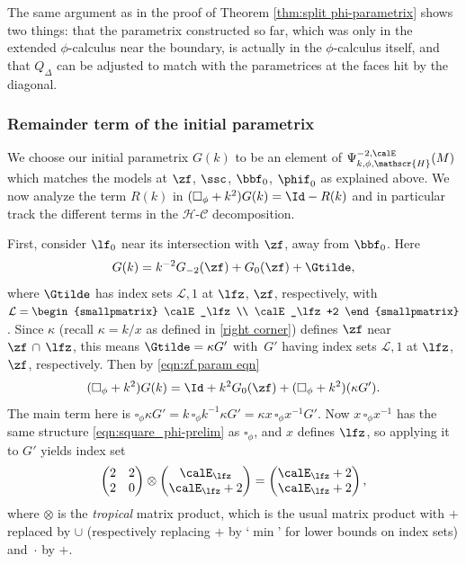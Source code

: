 The same argument as in the proof of Theorem \ref{thm:split phi-parametrix} shows two things: that the parametrix constructed so far, which was only in the extended $\phi$-calculus near the boundary, is actually in the $\phi$-calculus itself, and that $Q_\Delta$ can be adjusted to match with the parametrices at the faces hit by the diagonal.

\subsubsection{Remainder term of the initial parametrix}
We choose our initial parametrix $G(k)$ to be an element of $\Psi^{-2,\calE}_{k,\phi,\mathscr{H}}(M)$ which matches the models at $\zf$, $\ssc$, $\bbf_0$, $\phif_0$ as explained above. We now analyze the term $R(k)$ in $(\square_\phi+k^2)G(k) = \Id - R(k)$ and in particular track the different terms in the $\mathscr{H}$-$\mathscr{C}$ decomposition.

First, consider $\lf_0$ near its intersection with $\zf$, away from $\bbf_0$. Here
\[
G(k) = k^{-2}G_{-2}(\zf) + G_0(\zf) + \Gtilde,
\]
where $\Gtilde$ has index sets $\mathcal{L},1$ at $\lfz$, $\zf$, respectively, with $\mathcal{L}=
\begin{smallpmatrix}
\calE_\lfz \\ \calE_\lfz+2
\end{smallpmatrix}$. Since $\kappa$ (recall $\kappa=k/x$ as defined in \eqref{right corner}) defines $\zf$ near $\zf \,\cap \,\lfz$, this means $\Gtilde=\kappa G'$ with~$G'$ having index sets $\mathcal{L},1$ at $\lfz$, $\zf$, respectively. Then by \eqref{eqn:zf param eqn}
\[
(\square_\phi+k^2)G(k) = \Id+k^2G_0(\zf) + (\square_\phi+k^2)(\kappa G').
\]
The main term here is $\square_\phi\kappa G' = k \,\square_\phi k^{-1}\kappa G' = \kappa x\,\square_\phi x^{-1} G'$. Now $x\,\square_\phi x^{-1}$ has the same structure \eqref{eqn:square_phi-prelim} as $\square_\phi$, and $x$ defines $\lfz$, so applying it to $G'$ yields index set
\begin{equation}
\label{eqn:tropical product}
\begin{pmatrix}
2 & 2 \\ 2 & 0
\end{pmatrix}
\otimes
\begin{pmatrix}
\calE_\lfz \\ \calE_\lfz+2
\end{pmatrix}
=
\begin{pmatrix}
\calE_\lfz +2\\ \calE_\lfz+2
\end{pmatrix},
\end{equation}
where $\otimes$ is the \emph{tropical} matrix product, which is the usual matrix product with $+$ replaced by $\cup$ (respectively replacing $+$ by `$\min$' for lower bounds on index sets) and~$\cdot$ by $+$.

